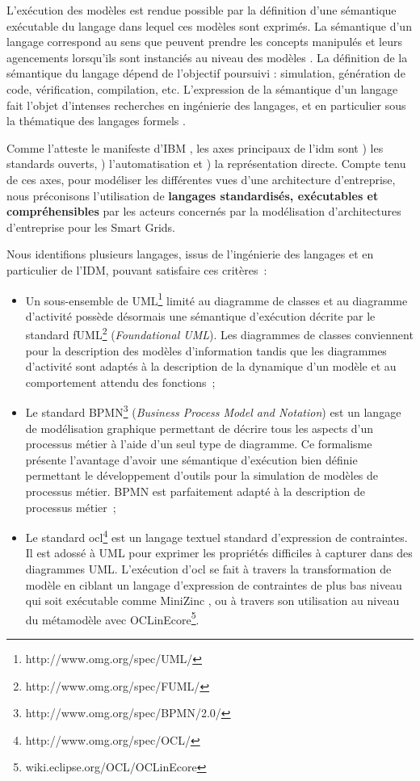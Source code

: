 L'exécution des modèles est rendue possible par la définition d'une sémantique exécutable du langage dans lequel ces modèles sont exprimés. La sémantique d'un langage correspond au sens que peuvent prendre les concepts manipulés et leurs agencements lorsqu'ils sont instanciés au niveau des modèles \cite{jezequel2012ingenierie}. La définition de la sémantique du langage dépend de l'objectif poursuivi : simulation, génération de code, vérification, compilation, etc. L'expression de la sémantique d'un langage fait l'objet d'intenses recherches en ingénierie des langages, et en particulier sous la thématique des langages formels \cite{kleppe2007language}. 

Comme l'atteste le manifeste d'IBM \cite{chesbrough2006research}, les axes principaux de l'\gls{idm} sont \primo\!) les standards ouverts, \secundo\!) l'automatisation et \tertio\!) la représentation directe. Compte tenu de ces axes, pour modéliser les différentes vues d'une architecture d'entreprise, nous préconisons l'utilisation de \textbf{langages standardisés, exécutables et compréhensibles} par les acteurs concernés par la modélisation d'architectures d'entreprise pour les Smart Grids. 

Nous identifions plusieurs langages, issus de l'ingénierie des langages et en particulier de l'IDM, pouvant satisfaire ces critères~:

\begin{itemize}

\item Un sous-ensemble de UML\footnote{http://www.omg.org/spec/UML/} limité au diagramme de classes et au diagramme d'activité possède désormais une sémantique d'exécution décrite par le standard fUML\footnote{http://www.omg.org/spec/FUML/} (\textit{Foundational UML}). Les diagrammes de classes conviennent pour la description des modèles d'information tandis que les diagrammes d'activité sont adaptés à la description de la dynamique d'un modèle et au comportement attendu des fonctions~;

\item Le standard BPMN\footnote{http://www.omg.org/spec/BPMN/2.0/} (\textit{Business Process Model and Notation}) est un langage de modélisation graphique permettant de décrire tous les aspects d'un processus métier à l'aide d'un seul type de diagramme. Ce formalisme présente l'avantage d'avoir une sémantique d'exécution bien définie permettant le développement d'outils pour la simulation de modèles de processus métier. BPMN est parfaitement adapté à la description de processus métier~;

\item Le standard \gls{ocl}\footnote{http://www.omg.org/spec/OCL/} est un langage textuel standard d'expression de contraintes. Il est adossé à UML pour exprimer les propriétés difficiles à capturer dans des diagrammes UML. L'exécution d'\gls{ocl} se fait à travers la transformation de modèle en ciblant un langage d'expression de contraintes de plus bas niveau qui soit exécutable comme MiniZinc \cite{nethercote2007minizinc}, ou à travers son utilisation au niveau du métamodèle avec OCLinEcore\footnote{wiki.eclipse.org/OCL/OCLinEcore}.

\end{itemize}

